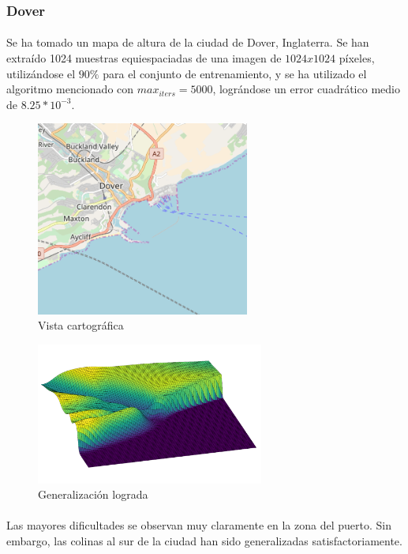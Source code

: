 \documentclass[12pt, twocolumn]{article}
\begin{document}
	\subsubsection{Dover}
	
	\paragraph{} Se ha tomado un mapa de altura de la ciudad de Dover, Inglaterra. Se han extraído 1024 muestras equiespaciadas de una imagen de $1024x1024$ píxeles, utilizándose el $90\%$ para el conjunto de entrenamiento, y se ha utilizado el algoritmo mencionado con $max_{iters} = 5000$, lográndose un error cuadrático medio de $8.25*10^{-3}$.
	
	\begin{figure}[H]
		\centering
		\includegraphics[width=7cm]{../results/other_terrains/dover/dover_map.png}
		\caption{Vista cartográfica}
		\label{dovermap}
	\end{figure}
	
	
	\begin{figure}[H]
		\centering
		\includegraphics[width=7.5cm]{../results/other_terrains/dover/dover_5000.png}
		\caption{Generalización lograda}
		\label{dover}
	\end{figure}
	
	\paragraph{} Las mayores dificultades se observan muy claramente en la zona del puerto. Sin embargo, las colinas al sur de la ciudad han sido generalizadas satisfactoriamente.  
	
\end{document}
